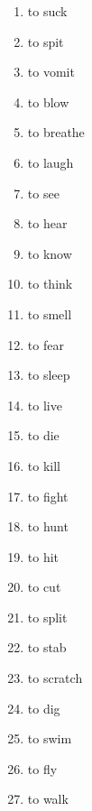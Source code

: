\documentclass[a5,landscape]{article}
\begin{document}
{\begin{multicols}{4}
\begin{enumerate}
\item   to suck 

\item   to spit 

\item   to vomit 

\item   to blow 

\item   to breathe 

\item   to laugh 

\item   to see 

\item   to hear 

\item   to know 

\item   to think 

\item   to smell 

\item   to fear 

\item   to sleep 

\item   to live 

\item   to die 

\item   to kill 

\item   to fight 

\item   to hunt 

\item   to hit 

\item   to cut 

\item   to split 

\item   to stab 

\item   to scratch 

\item   to dig 

\item   to swim 

\item   to fly 

\item   to walk 


\end{enumerate}
\end{multicols}}
\end{document}
